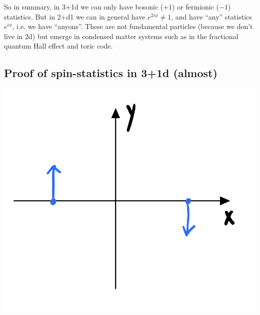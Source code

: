 So in summary, in 3+1d we can only have bosonic ($+1$) or fermionic ($-1$) statistics. But in 2+d1 we can in general have $e^{2i\phi} \neq 1$, and have ``any'' statistics $e^{i\phi}$, i.e. we have ``anyons''. These are not fundamental particles (because we don't live in 2d) but emerge in condensed matter systems such as in the fractional quantum Hall effect and toric code.

\subsection{Proof of spin-statistics in 3+1d (almost)}

\begin{center}
    \includegraphics[scale=0.4]{Lectures/Images/lec3-twospinors.png}
\end{center}

